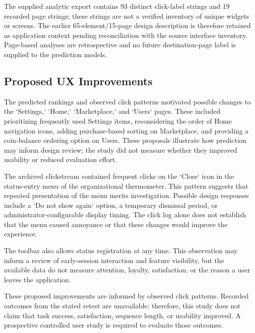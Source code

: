 \documentclass[sn-mathphys-num, Numbered]{sn-jnl}%
\theoremstyle{thmstyleone}%
\theoremstyle{thmstyletwo}%
\theoremstyle{thmstylethree}%
\begin{document}
The supplied analytic export contains 93 distinct click-label strings and 19 recorded page strings; these strings are not a verified inventory of unique widgets or screens. The earlier 65-element/15-page design description is therefore retained as application context pending reconciliation with the source interface inventory. Page-based analyses are retrospective and no future destination-page label is supplied to the prediction models.





\subsection{Proposed UX Improvements}
The predicted rankings and observed click patterns motivated possible changes to the `Settings,` `Home,` `Marketplace,` and `Users` pages. These included prioritizing frequently used Settings items, reconsidering the order of Home navigation icons, adding purchase-based sorting on Marketplace, and providing a coin-balance ordering option on Users. These proposals illustrate how prediction may inform design review; the study did not measure whether they improved usability or reduced evaluation effort.

The archived clickstream contained frequent clicks on the `Close` icon in the status-entry menu of the organizational thermometer. This pattern suggests that repeated presentation of the menu merits investigation. Possible design responses include a `Do not show again` option, a temporary dismissal period, or administrator-configurable display timing. The click log alone does not establish that the menu caused annoyance or that these changes would improve the experience.

The toolbar also allows status registration at any time. This observation may inform a review of early-session interaction and feature visibility, but the available data do not measure attention, loyalty, satisfaction, or the reason a user leaves the application.

These proposed improvements are informed by observed click patterns. Recorded outcomes from the stated retest are unavailable; therefore, this study does not claim that task success, satisfaction, sequence length, or usability improved. A prospective controlled user study is required to evaluate those outcomes.
\end{document}
